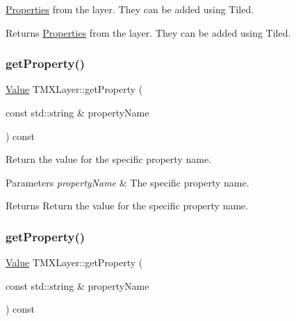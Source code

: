 \hyperlink{classProperties}{Properties} from the layer. They can be added using Tiled.

\begin{DoxyReturn}{Returns}
\hyperlink{classProperties}{Properties} from the layer. They can be added using Tiled. 
\end{DoxyReturn}
\mbox{\label{classTMXLayer_a6ed296d4b13f396f00815266c74054ff}} 
\subsubsection{\texorpdfstring{get\+Property()}{getProperty()}\hspace{0.1cm}{\footnotesize\ttfamily [1/2]}}
{\footnotesize\ttfamily \hyperlink{classValue}{Value} T\+M\+X\+Layer\+::get\+Property (\begin{DoxyParamCaption}\item[{const std\+::string \&}]{property\+Name }\end{DoxyParamCaption}) const}

Return the value for the specific property name.


\begin{DoxyParams}{Parameters}
{\em property\+Name} & The specific property name. \\
\hline
\end{DoxyParams}
\begin{DoxyReturn}{Returns}
Return the value for the specific property name. 
\end{DoxyReturn}
\mbox{\label{classTMXLayer_a6ed296d4b13f396f00815266c74054ff}} 
\subsubsection{\texorpdfstring{get\+Property()}{getProperty()}\hspace{0.1cm}{\footnotesize\ttfamily [2/2]}}
{\footnotesize\ttfamily \hyperlink{classValue}{Value} T\+M\+X\+Layer\+::get\+Property (\begin{DoxyParamCaption}\item[{const std\+::string \&}]{property\+Name }\end{DoxyParamCaption}) const}

